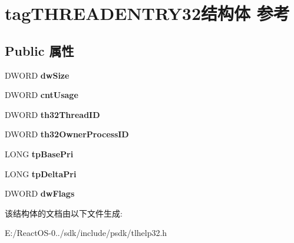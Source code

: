 \hypertarget{structtag_t_h_r_e_a_d_e_n_t_r_y32}{}\section{tag\+T\+H\+R\+E\+A\+D\+E\+N\+T\+R\+Y32结构体 参考}
\label{structtag_t_h_r_e_a_d_e_n_t_r_y32}
\subsection*{Public 属性}
\begin{DoxyCompactItemize}
\item 
\mbox{\label{structtag_t_h_r_e_a_d_e_n_t_r_y32_a0a89fdfb8ae2d93c5f223aaf514923e5}} 
D\+W\+O\+RD {\bfseries dw\+Size}
\item 
\mbox{\label{structtag_t_h_r_e_a_d_e_n_t_r_y32_a667761edc39937f2791dcf68619add56}} 
D\+W\+O\+RD {\bfseries cnt\+Usage}
\item 
\mbox{\label{structtag_t_h_r_e_a_d_e_n_t_r_y32_a35bafdb1378fa09638edc22450ade695}} 
D\+W\+O\+RD {\bfseries th32\+Thread\+ID}
\item 
\mbox{\label{structtag_t_h_r_e_a_d_e_n_t_r_y32_a79f56efb7ed4d079efe886a3a97bcb0c}} 
D\+W\+O\+RD {\bfseries th32\+Owner\+Process\+ID}
\item 
\mbox{\label{structtag_t_h_r_e_a_d_e_n_t_r_y32_a859f3d45adc2dcd2c8e286ba78d33a43}} 
L\+O\+NG {\bfseries tp\+Base\+Pri}
\item 
\mbox{\label{structtag_t_h_r_e_a_d_e_n_t_r_y32_a09cd08e6e96b5325e958033100c7d77c}} 
L\+O\+NG {\bfseries tp\+Delta\+Pri}
\item 
\mbox{\label{structtag_t_h_r_e_a_d_e_n_t_r_y32_a0c4e8957cfb93b3c3ad13d70f2471d1a}} 
D\+W\+O\+RD {\bfseries dw\+Flags}
\end{DoxyCompactItemize}


该结构体的文档由以下文件生成\+:\begin{DoxyCompactItemize}
\item 
E\+:/\+React\+O\+S-\/0../sdk/include/psdk/tlhelp32.\+h\end{DoxyCompactItemize}
